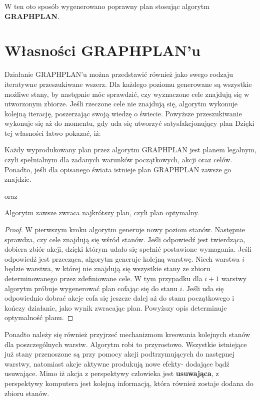     W ten oto sposób wygenerowano poprawny plan stosując algorytm \textbf{GRAPHPLAN}.

\section{Własności GRAPHPLAN'u}
    Działanie GRAPHPLAN'u można przedstawić również jako swego rodzaju iteratywne przeszukiwane wszerz. 
    Dla każdego poziomu generowane są wszystkie możliwe stany, by następnie móc sprawdzić, czy wyznaczone cele 
    znajdują się w utworzonym zbiorze. Jeśli rzeczone cele nie znajdują się, algorytm wykonuje kolejną iterację, 
    poszerzając swoją wiedzę o świecie. Powyższe przeszukiwanie wykonuje się aż do momentu, gdy uda się utworzyć satysfakcjonujący plan
    Dzięki tej własności łatwo pokazać, iż:
    \begin{theorem}
        Każdy wyprodukowany plan przez algorytm GRAPHPLAN jest planem legalnym, czyli spełnialnym dla zadanych 
        warunków początkowych, akcji oraz celów. Ponadto, jeśli dla opisanego świata istnieje plan GRAPHPLAN zawsze go znajdzie.
    \end{theorem}
    oraz
    \begin{theorem}
        Algorytm zawsze zwraca najkrótszy plan, czyli plan optymalny.
    \end{theorem}

    \begin{proof}
        W pierwszym kroku algorytm generuje nowy poziom stanów. Następnie sprawdza, czy cele znajdują się wśród stanów. Jeśli odpowiedź jest twierdząca,
        dobiera zbiór akcji, dzięki którym udało się spełnić postawione wymagania. Jeśli odpowiedź jest przecząca, algorytm generuje kolejną warstwę.
        Niech warstwa $i$ będzie warstwa, w której nie znajdują się wszystkie stany ze zbioru determinowanego przez zdefiniowane cele. W tym przypadku
        dla $i+1$ warstwy algorytm próbuje wygenerować plan cofając się do stanu $i$. Jeśli uda się odpowiednio dobrać akcje 
        cofa się jeszcze dalej aż do stanu początkowego i kończy działanie, jako wynik zwracając plan. Powyższy opis determinuje optymalność planu.
    \end{proof}


    Ponadto należy się również przyjrzeć mechanizmom kreowania kolejnych stanów dla poszczególnych warstw. Algorytm robi to przyrostowo. 
    Wszystkie istniejące już stany przenoszone są przy pomocy akcji podtrzymujących do następnej warstwy, natomiast akcje aktywne produkują 
    nowe efekty- dodające bądź usuwające. Mimo iż akcja z perspektywy człowieka jest \textbf{usuwająca}, 
    z perspektywy komputera jest kolejną informacją, która również zostaje dodana do zbioru stanów.

